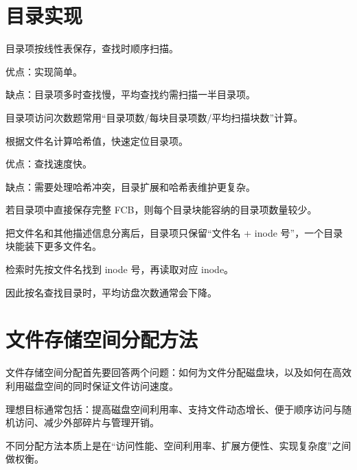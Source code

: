 \section{目录实现}
\begin{points}
  \item 目录项按线性表保存，查找时顺序扫描。
  \item 优点：实现简单。
  \item 缺点：目录项多时查找慢，平均查找约需扫描一半目录项。
  \item 目录项访问次数题常用“目录项数/每块目录项数/平均扫描块数”计算。
\end{points}


\begin{points}
  \item 根据文件名计算哈希值，快速定位目录项。
  \item 优点：查找速度快。
  \item 缺点：需要处理哈希冲突，目录扩展和哈希表维护更复杂。
\end{points}


\begin{points}
  \item 若目录项中直接保存完整 FCB，则每个目录块能容纳的目录项数量较少。
  \item 把文件名和其他描述信息分离后，目录项只保留“文件名 + inode 号”，一个目录块能装下更多文件名。
  \item 检索时先按文件名找到 inode 号，再读取对应 inode。
  \item 因此按名查找目录时，平均访盘次数通常会下降。
\end{points}


\section{文件存储空间分配方法}
\begin{points}
  \item 文件存储空间分配首先要回答两个问题：如何为文件分配磁盘块，以及如何在高效利用磁盘空间的同时保证文件访问速度。
  \item 理想目标通常包括：提高磁盘空间利用率、支持文件动态增长、便于顺序访问与随机访问、减少外部碎片与管理开销。
  \item 不同分配方法本质上是在“访问性能、空间利用率、扩展方便性、实现复杂度”之间做权衡。
\end{points}

